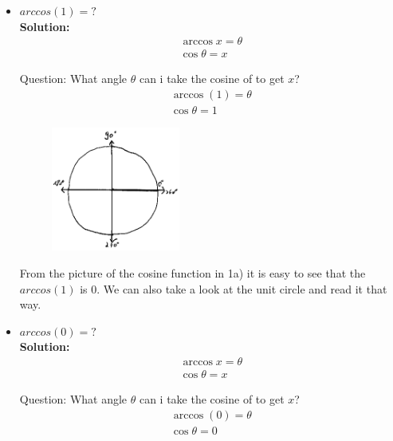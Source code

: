 \documentclass[a4paper]{article}
\begin{document}
\begin{enumerate}
\begin{enumerate}
	\begin{itemize}
		\item $arccos(1) = ?$\\
		\textbf{Solution:}\\
\begin{align*}
	\arccos x = \theta \\
	\cos \theta = x
\end{align*}

Question: What angle $\theta$ can i take the cosine of to get $x$?\\ 

\begin{align*}
	\arccos(1) = \theta\\
	\cos \theta = 1
\end{align*}

\begin{figure}[ht]
	\centering
  \includegraphics[width=0.4\textwidth]{c1.png}
\end{figure}


From the picture of the cosine function in 1a) it is easy to see that the $arccos(1)$ is $0$. We can also take a look at the unit circle and read it that way.\\

				\item $arccos(0) = ?$\\
				\textbf{Solution:}\\
		
\begin{align*}
	\arccos x = \theta \\
	\cos \theta = x
\end{align*}

Question: What angle $\theta$ can i take the cosine of to get $x$?\\ 

\begin{align*}
	\arccos(0) = \theta\\
	\cos \theta = 0
\end{align*}


\end{itemize}
\end{enumerate}
\end{enumerate}
\end{document}
